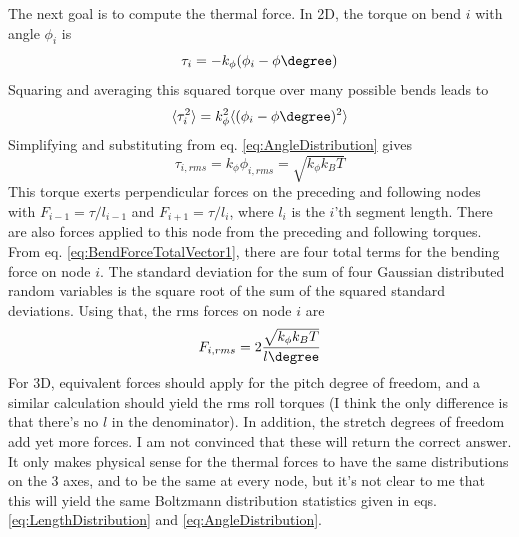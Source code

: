 \documentclass {scrbook}
\begin{document}
The next goal is to compute the thermal force. In 2D, the torque on bend $i$ with angle $\phi_i$ is
$$\tau_i = -k_\phi (\phi_i -\phi\degree)$$
Squaring and averaging this squared torque over many possible bends leads to
$$\langle \tau_i^2 \rangle = k_\phi^2 \langle(\phi_i -\phi\degree)^2 \rangle$$
Simplifying and substituting from eq. \ref{eq:AngleDistribution} gives
$$\tau_{i,rms} = k_\phi \phi_{i,rms} = \sqrt{k_\phi k_B T}$$
This torque exerts perpendicular forces on the preceding and following nodes with $F_{i-1}=\tau/l_{i-1}$ and $F_{i+1}=\tau/l_i$, where $l_i$ is the $i$'th segment length. There are also forces applied to this node from the preceding and following torques. From eq. \ref{eq:BendForceTotalVector1}, there are four total terms for the bending force on node $i$. The standard deviation for the sum of four Gaussian distributed random variables is the square root of the sum of the squared standard deviations. Using that, the rms forces on node $i$ are
\begin{equation}
F_{i,rms} = 2 \frac{ \sqrt{k_\phi k_B T}}{l\degree}
\label{eq:ThermalForce2}
\end{equation}
For 3D, equivalent forces should apply for the pitch degree of freedom, and a similar calculation should yield the rms roll torques (I think the only difference is that there's no $l$ in the denominator). In addition, the stretch degrees of freedom add yet more forces. I am not convinced that these will return the correct answer. It only makes physical sense for the thermal forces to have the same distributions on the 3 axes, and to be the same at every node, but it's not clear to me that this will yield the same Boltzmann distribution statistics given in eqs. \ref{eq:LengthDistribution} and \ref{eq:AngleDistribution}.
\end{document}
